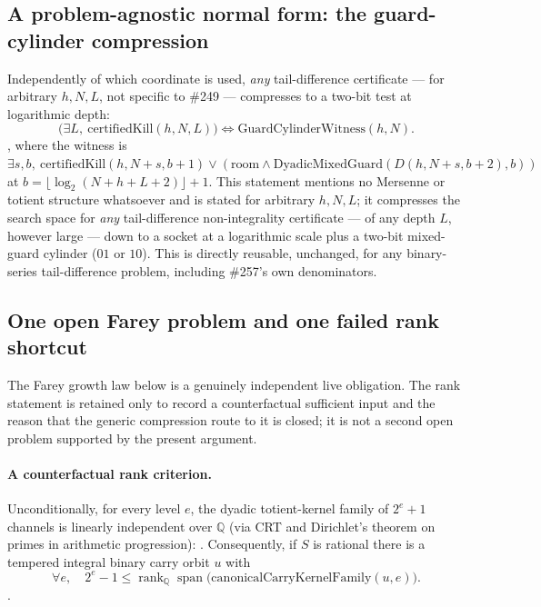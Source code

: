 \subsection{A problem-agnostic normal form: the guard-cylinder compression}

Independently of which coordinate is used, \emph{any} tail-difference
certificate — for arbitrary $h,N,L$, not specific to \#249 — compresses to
a two-bit test at logarithmic depth:
\[
  \bigl(\exists L,\ \mathrm{certifiedKill}(h,N,L)\bigr)
  \iff
  \mathrm{GuardCylinderWitness}(h,N).
\]
\quad {} \quad {} \quad {}, where the
witness is $\exists s,b,\ \mathrm{certifiedKill}(h,N{+}s,b{+}1) \vee
(\text{room} \wedge \mathrm{DyadicMixedGuard}(D(h,N{+}s,b{+}2),b))$ at
$b=\lfloor\log_2(N{+}h{+}L{+}2)\rfloor+1$. This statement mentions no
Mersenne or totient structure whatsoever and is stated for arbitrary
$h,N,L$; it compresses the search space for \emph{any} tail-difference
non-integrality certificate — of any depth $L$, however large — down to a
socket at a logarithmic scale plus a two-bit mixed-guard cylinder
($01$ or $10$). This is directly reusable, unchanged, for any binary-series
tail-difference problem, including \#257's own denominators.

\subsection{One open Farey problem and one failed rank shortcut}

The Farey growth law below is a genuinely independent live obligation.  The
rank statement is retained only to record a counterfactual sufficient input
and the reason that the generic compression route to it is closed; it is not a
second open problem supported by the present argument.

\paragraph{A counterfactual rank criterion.}
Unconditionally, for every level $e$, the dyadic totient-kernel family of
$2^e+1$ channels is linearly independent over $\mathbb{Q}$ (via CRT and
Dirichlet's theorem on primes in arithmetic progression):
\quad {} \quad {} \quad {}.
Consequently, if $S$ is rational there is a tempered integral binary carry
orbit $u$ with
\[
  \forall e,\quad 2^e-1 \le \operatorname{rank}_{\mathbb{Q}}\operatorname{span}\bigl(\mathrm{canonicalCarryKernelFamily}(u,e)\bigr).
\]
\quad {} \quad {} \quad {}.

